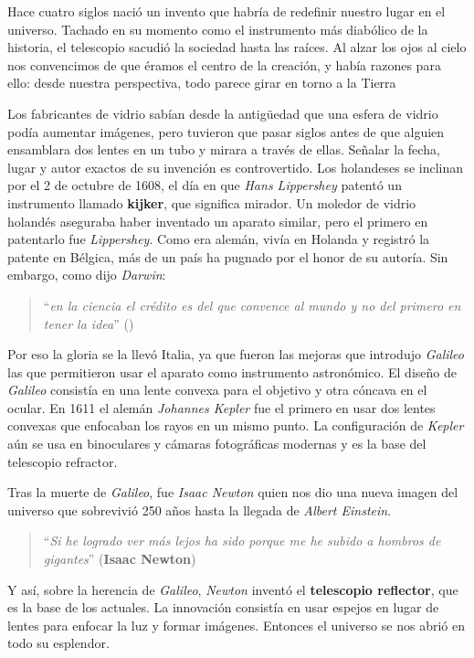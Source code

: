 \bigskip
Hace cuatro siglos nació un invento que habría de redefinir nuestro lugar en el universo. Tachado en su momento como el instrumento más diabólico de la historia, el telescopio sacudió la sociedad hasta las raíces. Al alzar los ojos al cielo nos convencimos de que éramos el centro de la creación, y había razones para ello: desde nuestra perspectiva, todo parece girar en torno a la Tierra

\bigskip
Los fabricantes de vidrio sabían desde la antigüedad que una esfera de vidrio podía aumentar imágenes, pero tuvieron que pasar siglos antes de que alguien ensamblara dos lentes en un tubo y mirara a través de ellas. Señalar la fecha, lugar y autor exactos de su invención es controvertido. Los holandeses se inclinan por el 2 de octubre de 1608, el día en que \textit{Hans Lippershey} patentó un instrumento llamado \textbf{kijker}, que significa mirador. Un moledor de vidrio holandés aseguraba haber inventado un aparato similar, pero el primero en patentarlo fue \textit{Lippershey}. Como era alemán, vivía en Holanda y registró la patente en Bélgica, más de un país ha pugnado por el honor de su autoría. Sin embargo, como dijo \textit{Darwin}:
\begin{quote}``\textit{en la ciencia el crédito es del que convence al mundo y no del primero en tener la idea}''
\newline()
\end{quote}
Por eso la gloria se la llevó Italia, ya que fueron las mejoras que introdujo \textit{Galileo} las que permitieron usar el aparato como instrumento astronómico. El diseño de \textit{Galileo} consistía en una lente convexa para el objetivo y otra cóncava en el ocular. En 1611 el alemán \textit{Johannes Kepler} fue el primero en usar dos lentes convexas que enfocaban los rayos en un mismo punto. La configuración de \textit{Kepler} aún se usa en binoculares y cámaras fotográficas modernas y es la base del telescopio refractor.

\bigskip
Tras la muerte de \textit{Galileo}, fue \textit{Isaac Newton} quien nos dio una nueva imagen del universo que sobrevivió 250 años hasta la llegada de \textit{Albert Einstein}.

\begin{quote}``\textit{Si he logrado ver más lejos ha sido porque me he subido a hombros de gigantes}''
\newline(\textbf{Isaac Newton})
\end{quote}

Y así, sobre la herencia de \textit{Galileo}, \textit{Newton} inventó el \textbf{telescopio reflector}, que es la base de los actuales. La innovación consistía en usar espejos en lugar de lentes para enfocar la luz y formar imágenes. Entonces el universo se nos abrió en todo su esplendor.

